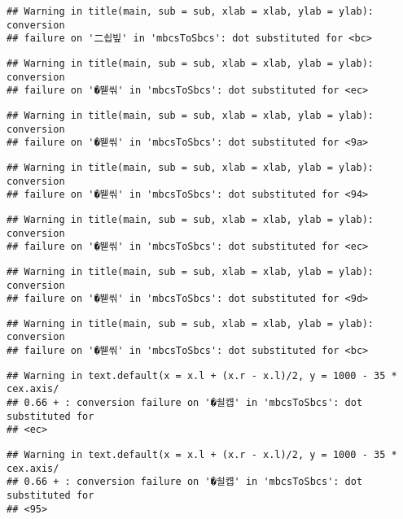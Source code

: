 \documentclass[]{article}
\begin{document}
\begin{verbatim}
## Warning in title(main, sub = sub, xlab = xlab, ylab = ylab): conversion
## failure on '二쇱빞' in 'mbcsToSbcs': dot substituted for <bc>
\end{verbatim}

\begin{verbatim}
## Warning in title(main, sub = sub, xlab = xlab, ylab = ylab): conversion
## failure on '�붿씪' in 'mbcsToSbcs': dot substituted for <ec>
\end{verbatim}

\begin{verbatim}
## Warning in title(main, sub = sub, xlab = xlab, ylab = ylab): conversion
## failure on '�붿씪' in 'mbcsToSbcs': dot substituted for <9a>
\end{verbatim}

\begin{verbatim}
## Warning in title(main, sub = sub, xlab = xlab, ylab = ylab): conversion
## failure on '�붿씪' in 'mbcsToSbcs': dot substituted for <94>
\end{verbatim}

\begin{verbatim}
## Warning in title(main, sub = sub, xlab = xlab, ylab = ylab): conversion
## failure on '�붿씪' in 'mbcsToSbcs': dot substituted for <ec>
\end{verbatim}

\begin{verbatim}
## Warning in title(main, sub = sub, xlab = xlab, ylab = ylab): conversion
## failure on '�붿씪' in 'mbcsToSbcs': dot substituted for <9d>
\end{verbatim}

\begin{verbatim}
## Warning in title(main, sub = sub, xlab = xlab, ylab = ylab): conversion
## failure on '�붿씪' in 'mbcsToSbcs': dot substituted for <bc>
\end{verbatim}

\begin{verbatim}
## Warning in text.default(x = x.l + (x.r - x.l)/2, y = 1000 - 35 * cex.axis/
## 0.66 + : conversion failure on '�쇨컙' in 'mbcsToSbcs': dot substituted for
## <ec>
\end{verbatim}

\begin{verbatim}
## Warning in text.default(x = x.l + (x.r - x.l)/2, y = 1000 - 35 * cex.axis/
## 0.66 + : conversion failure on '�쇨컙' in 'mbcsToSbcs': dot substituted for
## <95>
\end{verbatim}
\end{document}
